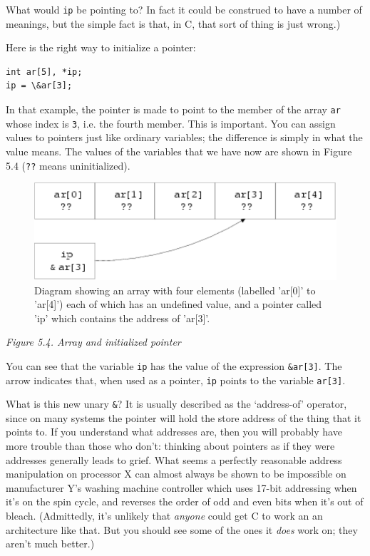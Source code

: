    What would \texttt{ip} be pointing to? In fact it could be
    construed to have a number of meanings, but the simple fact is that, in
    C, that sort of thing is just wrong.)


   Here is the right way to initialize a pointer:


   \begin{Verbatim}
int ar[5], *ip;
ip = \&ar[3];
\end{Verbatim}

   In that example, the pointer is made to point to the member of the
    array \texttt{ar} whose index is \texttt{3}, i.e. the fourth
    member. This is important. You can assign values to pointers just like
    ordinary variables; the difference is simply in what the value means.
    The values of the variables that we have now are shown in Figure 5.4 (\texttt{??} means uninitialized).


   \begin{figure}\centering\includegraphics[type=pdf,read=.pdf,ext=.pdf,scale=1.0]{figure/5.4}\caption{Diagram showing an array with four elements (labelled 'ar[0]' to            'ar[4]') each of which has an undefined value, and a pointer            called 'ip' which contains the address of 'ar[3]'.}\end{figure}

\begin{center}\textit{Figure 5.4. Array and initialized pointer}\end{center}


   You can see that the variable \texttt{ip} has the value of the
    expression \texttt{\&ar[3]}. The arrow indicates that, when used
    as a pointer, \texttt{ip} points to the variable
    \texttt{ar[3]}.


   What is this new unary \texttt{\&}? It is usually described as
    the `address-of' operator, since on many systems the pointer will
    hold the store address of the thing that it points to. If you understand
    what addresses are, then you will probably have more trouble than those
    who don't: thinking about pointers as if they were addresses generally
    leads to grief. What seems a perfectly reasonable address manipulation
    on processor X can almost always be shown to be impossible on
    manufacturer Y's washing machine controller which uses 17-bit addressing
    when it's on the spin cycle, and reverses the order of odd and even bits
    when it's out of bleach. (Admittedly, it's unlikely that \textit{anyone}
    could get C to work an an architecture like that. But you should see
    some of the ones it \textit{does} work on; they aren't much better.)


